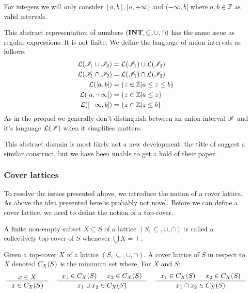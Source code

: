 For integers we will only consider $[a, b], [a, +\infty)$ and $(-\infty, b]$ where $a, b \in \mathbb{Z}$ as valid intervals.

This abstract representation of numbers $(\mathbf{INT}, \subseteq, \cup, \cap)$ has the same issue as regular expressions: It is not finite.
We define the language of union intervals as follows:
\begin{align}
    \mathcal{L}(\mathscr{I}_1 \cup \mathscr{I}_2) &= \mathcal{L}(\mathscr{I}_1) \cup \mathcal{L}(\mathscr{I}_2) \\
    \mathcal{L}(\mathscr{I}_1 \cap \mathscr{I}_2) &= \mathcal{L}(\mathscr{I}_1) \cap \mathcal{L}(\mathscr{I}_2) \\
    \mathcal{L}([a, b]) &= \left\{ z \in \mathbb{Z} \middle| a \leq z \leq b \right\} \\
    \mathcal{L}([a, +\infty]) &= \left\{ z \in \mathbb{Z} \middle| a \leq z \right\} \\
    \mathcal{L}([-\infty, b]) &= \left\{ z \in \mathbb{Z} \middle| z \leq b \right\}
\end{align}
As in the prequel we generally don't distinguish between an union interval $\mathscr{I}$ and it's language $\mathcal{L}(\mathscr{I})$ when it simplifies matters.

This abstract domain is most likely not a new development, the title of \cite{li2010abstract} suggest a similar construct, but we have been unable to get a hold of their paper.

\subsubsection{Cover lattices}\label{sec:cover-lattice}
To resolve the issues presented above, we introduce the notion of a cover lattice.
As above the idea presented here is probably not novel.
Before we can define a cover lattice, we need to define the notion of a top-cover.

\begin{definition}
    A finite non-empty subset $X \subseteq S$ of a lattice $(S, \subseteq, \cup, \cap)$ is called a collectively top-cover of $S$ whenever $\bigcup X = \top$.
\end{definition}

\begin{definition}\label{def:coverlattice}
Given a top-cover $X$ of a lattice $(S, \subseteq, \cup, \cap)$.
A cover lattice of $S$ in respect to $X$ denoted $C_{X}(S)$ is the minimum set where,
For $X$ and $S$:
\begin{align}
    \inference{x \in X}{x \in C_X(S)} \quad
    \inference{x_1 \in C_X(S) & x_2 \in C_X(S)}{x_1 \cup  x_2 \in C_X(S)} \quad
    \inference{x_1 \in C_X(S) & x_2 \in C_X(S)}{x_1 \cap  x_2 \in C_X(S)}
\end{align}
\end{definition}

